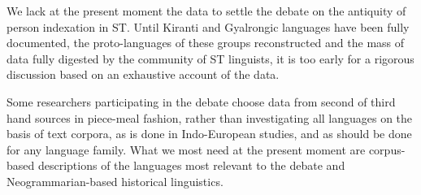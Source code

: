 \documentclass[oldfontcommands,oneside,a4paper,11pt]{article}
\begin{document}
We lack at the present moment the data to settle the debate on the antiquity of person indexation in ST. Until Kiranti and Gyalrongic languages have been fully documented, the proto-languages of these groups reconstructed and the mass of data fully digested by the community of ST linguists, it is too early for a rigorous discussion based on an exhaustive account of the data. 

Some researchers participating in the debate choose data from second of third hand sources in piece-meal fashion, rather than investigating all languages on the basis of text corpora, as is done in Indo-European studies, and as should be done for any language family. What we most need at the present moment are corpus-based descriptions of the languages most relevant to the debate and Neogrammarian-based historical linguistics.

\charis


\end{document}
